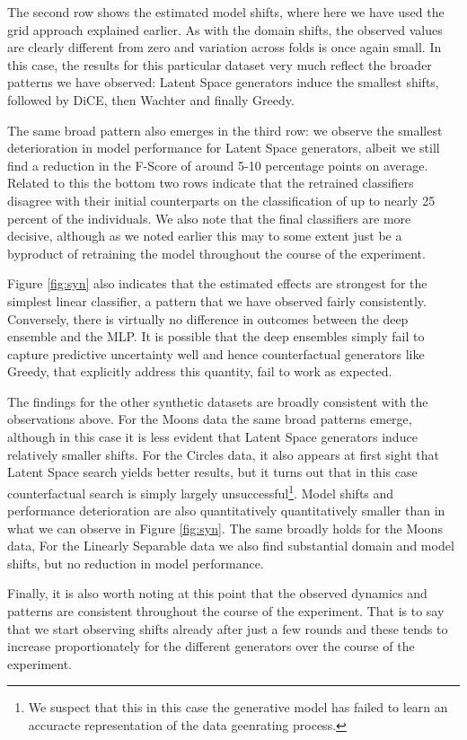 \documentclass[conference,final,]{IEEEtran}
\theoremstyle{definition}
\theoremstyle{definition}
\theoremstyle{definition}
\theoremstyle{definition}
\theoremstyle{remark}
\begin{document}
The second row shows the estimated model shifts, where here we have used the grid approach explained earlier. As with the domain shifts, the observed values are clearly different from zero and variation across folds is once again small. In this case, the results for this particular dataset very much reflect the broader patterns we have observed: Latent Space generators induce the smallest shifts, followed by DiCE, then Wachter and finally Greedy.

The same broad pattern also emerges in the third row: we observe the smallest deterioration in model performance for Latent Space generators, albeit we still find a reduction in the F-Score of around 5-10 percentage points on average. Related to this the bottom two rows indicate that the retrained classifiers disagree with their initial counterparts on the classification of up to nearly 25 percent of the individuals. We also note that the final classifiers are more decisive, although as we noted earlier this may to some extent just be a byproduct of retraining the model throughout the course of the experiment.

Figure \ref{fig:syn} also indicates that the estimated effects are strongest for the simplest linear classifier, a pattern that we have observed fairly consistently. Conversely, there is virtually no difference in outcomes between the deep ensemble and the MLP. It is possible that the deep ensembles simply fail to capture predictive uncertainty well and hence counterfactual generators like Greedy, that explicitly address this quantity, fail to work as expected.

The findings for the other synthetic datasets are broadly consistent with the observations above. For the Moons data the same broad patterns emerge, although in this case it is less evident that Latent Space generators induce relatively smaller shifts. For the Circles data, it also appears at first sight that Latent Space search yields better results, but it turns out that in this case counterfactual search is simply largely unsuccessful\footnote{We suspect that this in this case the generative model has failed to learn an accuracte representation of the data geenrating process.}. Model shifts and performance deterioration are also quantitatively quantitatively smaller than in what we can observe in Figure \ref{fig:syn}. The same broadly holds for the Moons data, For the Linearly Separable data we also find substantial domain and model shifts, but no reduction in model performance.

Finally, it is also worth noting at this point that the observed dynamics and patterns are consistent throughout the course of the experiment. That is to say that we start observing shifts already after just a few rounds and these tends to increase proportionately for the different generators over the course of the experiment.
\end{document}
